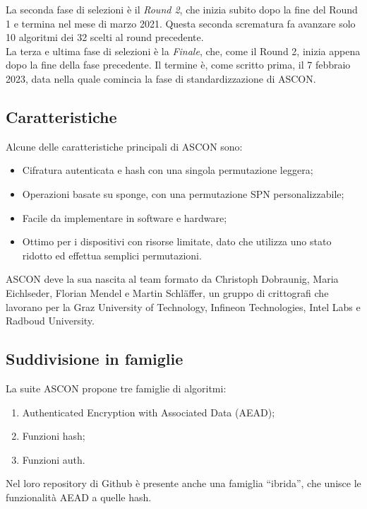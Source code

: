 \noindent La seconda fase di selezioni è il \textit{Round 2}, che inizia subito dopo la fine del Round 1 e termina nel mese di marzo 2021. Questa seconda scrematura fa avanzare solo 10 algoritmi dei 32 scelti al round precedente\cite{nist-timeline}\cite{nist-competition}\cite{nist-round-2}. \\

\noindent La terza e ultima fase di selezioni è la \textit{Finale}, che, come il Round 2, inizia appena dopo la fine della fase precedente. Il termine è, come scritto prima, il 7 febbraio 2023, data nella quale comincia la fase di standardizzazione di ASCON\cite{nist-timeline}\cite{nist-competition}.

\subsection{Caratteristiche}

\noindent Alcune delle caratteristiche principali di ASCON sono:
\begin{itemize}
    \item Cifratura autenticata e hash con una singola permutazione leggera;
    \item Operazioni basate su sponge, con una permutazione SPN personalizzabile;
    \item Facile da implementare in software e hardware;
    \item Ottimo per i dispositivi con risorse limitate, dato che utilizza uno stato ridotto ed effettua semplici permutazioni.
\end{itemize}
ASCON deve la sua nascita al team formato da Christoph Dobraunig, Maria Eichlseder, Florian Mendel e Martin Schläffer\cite{ascon-contact}, un gruppo di crittografi che lavorano per la Graz University of Technology, Infineon Technologies, Intel Labs e Radboud University\cite{ascon-overview}.

\subsection{Suddivisione in famiglie}

La suite ASCON propone tre famiglie di algoritmi:
\begin{enumerate}[label=\Roman*.]
    \item Authenticated Encryption with Associated Data (AEAD);
    \item Funzioni hash;
    \item Funzioni auth.
\end{enumerate}
Nel loro repository di Github\cite{github} è presente anche una famiglia ``ibrida'', che unisce le funzionalità AEAD a quelle hash.

